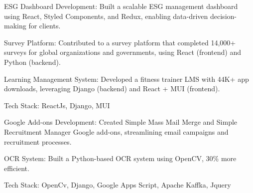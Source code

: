 \documentclass[]{deedy-resume-reversed}
\begin{document}
\begin{minipage}[t]{0.65\textwidth}
\begin{tightemize}
\item ESG Dashboard Development: Built a scalable ESG management dashboard using React, Styled Components, and Redux, enabling data-driven decision-making for clients.
\item Survey Platform: Contributed to a survey platform that completed 14,000+ surveys for global organizations and governments, using React (frontend) and Python (backend).
\item Learning Management System: Developed a fitness trainer LMS with 44K+ app downloads, leveraging Django (backend) and React + MUI (frontend).
\item Tech Stack: ReactJs, Django, MUI
\end{tightemize}
\sectionsep

\begin{tightemize}
\item Google Add-ons Development: Created Simple Mass Mail Merge and Simple Recruitment Manager Google add-ons, streamlining email campaigns and recruitment processes.
\item OCR System: Built a Python-based OCR system using OpenCV, 30\% more efficient.
\item Tech Stack: OpenCv, Django, Google Apps Script, Apache Kaffka, Jquery
\end{tightemize}
\sectionsep

\end{minipage}
\hfill
\end{document}
